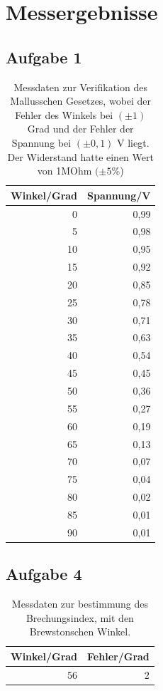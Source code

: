 \documentclass[12pt]{scrartcl}
\begin{document}
\section{Messergebnisse}
\subsection{Aufgabe 1}
\begin{table}[H]
\caption{Messdaten zur Verifikation des Mallusschen Gesetzes, wobei der Fehler des Winkels bei $(\pm 1)$ Grad  und der Fehler der Spannung bei $(\pm 0,1)$ V liegt. Der Widerstand hatte einen Wert von 1MOhm $(\pm 5$\%)}
\begin{center}
\begin{tabular}{|r|r|}
\hline
\multicolumn{1}{|l|}{Winkel/Grad} & \multicolumn{1}{l|}{Spannung/V} \\ \hline
0 & 0,99 \\ \hline
5 & 0,98 \\ \hline
10 & 0,95 \\ \hline
15 & 0,92 \\ \hline
20 & 0,85 \\ \hline
25 & 0,78 \\ \hline
30 & 0,71 \\ \hline
35 & 0,63 \\ \hline
40 & 0,54 \\ \hline
45 & 0,45 \\ \hline
50 & 0,36 \\ \hline
55 & 0,27 \\ \hline
60 & 0,19 \\ \hline
65 & 0,13 \\ \hline
70 & 0,07 \\ \hline
75 & 0,04 \\ \hline
80 & 0,02 \\ \hline
85 & 0,01 \\ \hline
90 & 0,01 \\ \hline
\end{tabular}
\end{center}
\label{tab:a_1}
\end{table}

\subsection{Aufgabe 4}
\begin{table}[htbp]
\caption{Messdaten zur bestimmung des Brechungsindex, mit den Brewstonschen Winkel.}
\begin{center}
\begin{tabular}{|l|l|}
\hline
Winkel/Grad & Fehler/Grad \\ \hline
\multicolumn{1}{|r|}{56} & \multicolumn{1}{r|}{2} \\ \hline
\end{tabular}
\end{center}
\label{tab:a_4}
\end{table}
\end{document}
